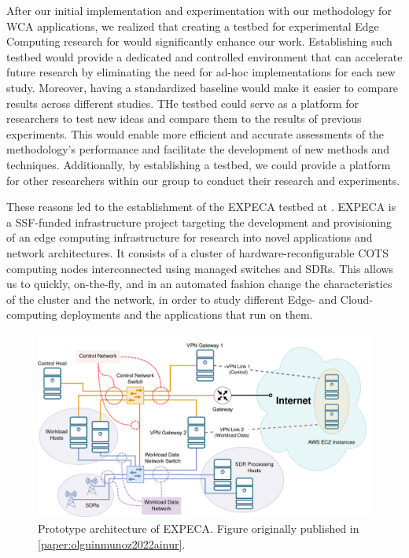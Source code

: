 After our initial implementation and experimentation with our methodology for \gls{WCA} applications, we realized that creating a testbed for experimental Edge Computing research for would significantly enhance our work.
Establishing such testbed would provide a dedicated and controlled environment that can accelerate future research by eliminating the need for ad-hoc implementations for each new study.
Moreover, having a standardized baseline would make it easier to compare results across different studies.
THe testbed could serve as a platform for researchers to test new ideas and compare them to the results of previous experiments.
This would enable more efficient and accurate assessments of the methodology's performance and facilitate the development of new methods and techniques.
Additionally, by establishing a testbed, we could provide a platform for other researchers within our group to conduct their research and experiments.

These reasons led to the establishment of the \gls{EXPECA} testbed at .
\gls{EXPECA} is a \gls{SSF}-funded infrastructure project targeting the development and provisioning of an edge computing infrastructure for research into novel applications and network architectures.
It consists of a cluster of hardware-reconfigurable \gls{COTS} computing nodes interconnected using managed switches and \glspl{SDR}.
This allows us to quickly, on-the-fly, and in an automated fashion change the characteristics of the cluster and the network, in order to study different Edge- and Cloud-computing deployments and the applications that run on them.

\begin{figure}
    \centering
    \includegraphics[width=.9\textwidth]{publications/2022Ainur/figures/network}
    \caption{
        Prototype architecture of \acs{EXPECA}.
        Figure originally published in \cref{paper:olguinmunoz2022ainur}.
    }\label{fig:expeca}
\end{figure}

